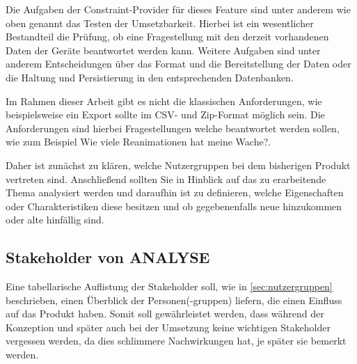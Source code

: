 Die Aufgaben der Constraint-Provider für dieses \gls{Feature} sind unter anderem wie oben genannt das Testen der Umsetzbarkeit.
Hierbei ist ein wesentlicher Bestandteil die Prüfung, ob eine Fragestellung mit den derzeit vorhandenen Daten der Geräte beantwortet werden kann.
Weitere Aufgaben sind unter anderem Entscheidungen über das Format und die Bereitstellung der Daten oder die Haltung und Persistierung in den entsprechenden Datenbanken.

Im Rahmen dieser Arbeit gibt es nicht die klassischen Anforderungen, wie beispielsweise \glqq ein Export sollte im CSV- und Zip-Format möglich sein\grqq. Die Anforderungen sind hierbei Fragestellungen welche beantwortet werden sollen, wie zum Beispiel \glqq Wie viele Reanimationen hat meine Wache?\grqq.

Daher ist zunächst zu klären, welche Nutzergruppen bei dem bisherigen Produkt vertreten sind.
Anschließend sollten Sie in Hinblick auf das zu erarbeitende Thema analysiert werden und daraufhin ist zu definieren, welche Eigenschaften oder Charakteristiken diese besitzen und ob gegebenenfalls neue hinzukommen oder alte hinfällig sind. 

\subsection{Stakeholder von \acrlong*{ANALYSE}}
\label{subsec:stakeholder}
Eine tabellarische Auflistung der Stakeholder soll, wie in \ref{sec:nutzergruppen} beschrieben, einen Überblick der Personen(-gruppen) liefern, die einen Einfluss auf das Produkt haben.
Somit soll gewährleistet werden, dass während der Konzeption und später auch bei der Umsetzung keine wichtigen Stakeholder vergessen werden, da dies schlimmere Nachwirkungen hat, je später sie bemerkt werden.


